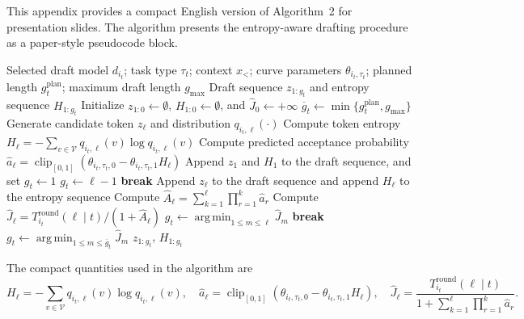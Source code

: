 \documentclass[11pt,a4paper]{ctexart}
\newcommand{\clip}{\operatorname{clip}}
\newcommand{\argmin}{\operatorname*{arg\,min}}
\begin{document}
This appendix provides a compact English version of Algorithm~2 for presentation slides. The algorithm presents the entropy-aware drafting procedure as a paper-style pseudocode block.

\begin{algorithm}[t]
\caption{Entropy-Aware Dynamic Drafting}
\label{alg:entropy_drafting_en}
\begin{algorithmic}[1]
\Require Selected draft model $d_{i_t}$; task type $\tau_t$; context $x_{<}$; curve parameters $\theta_{i_t,\tau_t}$; planned length $g_t^{\mathrm{plan}}$; maximum draft length $g_{\max}$
\Ensure Draft sequence $z_{1:g_t}$ and entropy sequence $H_{1:g_t}$
\State Initialize $z_{1:0}\gets\emptyset$, $H_{1:0}\gets\emptyset$, and $\widehat{J}_0\gets+\infty$
\State $\overline{g}_t\gets\min\{g_t^{\mathrm{plan}},g_{\max}\}$
    \State Generate candidate token $z_\ell$ and distribution $q_{i_t,\ell}(\cdot)$
    \State Compute token entropy $H_\ell=-\sum_{v\in\mathcal{V}}q_{i_t,\ell}(v)\log q_{i_t,\ell}(v)$
    \State Compute predicted acceptance probability $\widehat{a}_\ell=\clip_{[0,1]}(\theta_{i_t,\tau_t,0}-\theta_{i_t,\tau_t,1}H_\ell)$
            \State Append $z_1$ and $H_1$ to the draft sequence, and set $g_t\gets1$
        \Else
            \State $g_t\gets\ell-1$
        \EndIf
        \State \textbf{break}
    \EndIf
    \State Append $z_\ell$ to the draft sequence and append $H_\ell$ to the entropy sequence
    \State Compute $\widehat{A}_\ell=\sum_{k=1}^{\ell}\prod_{r=1}^{k}\widehat{a}_r$
    \State Compute $\widehat{J}_\ell=T_{i_t}^{\mathrm{round}}(\ell\mid t)/(1+\widehat{A}_\ell)$
        \State $g_t\gets\argmin_{1\leq m\leq \ell}\widehat{J}_m$
        \State \textbf{break}
    \EndIf
        \State $g_t\gets\argmin_{1\leq m\leq \overline{g}_t}\widehat{J}_m$
    \EndIf
\EndFor
\State \Return $z_{1:g_t}$, $H_{1:g_t}$
\end{algorithmic}
\end{algorithm}

The compact quantities used in the algorithm are
\begin{equation}
    H_\ell
    =
    -\sum_{v\in\mathcal{V}}q_{i_t,\ell}(v)\log q_{i_t,\ell}(v),
    \quad
    \widehat{a}_\ell
    =
    \clip_{[0,1]}\!\left(\theta_{i_t,\tau_t,0}-\theta_{i_t,\tau_t,1}H_\ell\right),
    \quad
    \widehat{J}_\ell
    =
    \frac{T_{i_t}^{\mathrm{round}}(\ell\mid t)}
    {1+\sum_{k=1}^{\ell}\prod_{r=1}^{k}\widehat{a}_r}.
    \label{eq:appendix_algorithm_2_quantities}
\end{equation}
\end{document}
